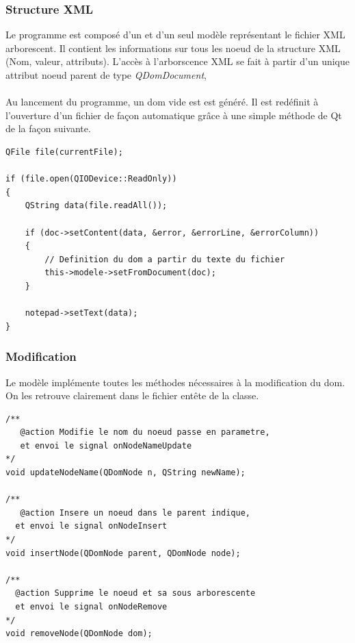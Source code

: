 \subsubsection{Structure XML}

Le programme est composé d'un et d'un seul modèle représentant le fichier XML arborescent.
Il contient les informations sur tous les noeud de la structure XML (Nom, valeur, attributs).
L'accès à l'arborscence XML se fait à partir d'un unique attribut noeud parent de type \emph{QDomDocument}, 

\paragraph{}
Au lancement du programme, un dom vide est est généré. Il est redéfinit à l'ouverture d'un fichier de façon automatique grâce à une simple méthode de Qt de la façon suivante.

\begin{lstlisting}
QFile file(currentFile);

if (file.open(QIODevice::ReadOnly))
{
    QString data(file.readAll());

    if (doc->setContent(data, &error, &errorLine, &errorColumn))
    {
        // Definition du dom a partir du texte du fichier
        this->modele->setFromDocument(doc);
    }

    notepad->setText(data);
}
\end{lstlisting}

\subsubsection{Modification}

Le modèle implémente toutes les méthodes nécessaires à la modification du dom. On les retrouve clairement dans le fichier entête de la classe.


\begin{lstlisting}
/**
   @action Modifie le nom du noeud passe en parametre,
   et envoi le signal onNodeNameUpdate
*/
void updateNodeName(QDomNode n, QString newName);

/**
   @action Insere un noeud dans le parent indique,
  et envoi le signal onNodeInsert
*/
void insertNode(QDomNode parent, QDomNode node);

/**
  @action Supprime le noeud et sa sous arborescente
  et envoi le signal onNodeRemove
*/
void removeNode(QDomNode dom);
\end{lstlisting}

